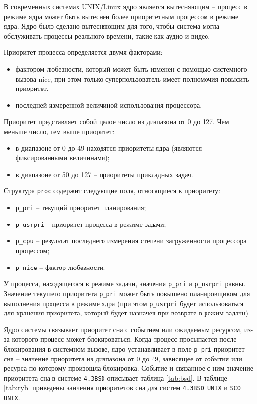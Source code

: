 В современных системах UNIX/Linux ядро является вытесняющим -- процесс
в режиме ядра может быть вытеснен более приоритетным процессом в режиме ядра.
Ядро было сделано вытесняющим для того, чтобы система могла обслуживать
процессы реального времени, такие как аудио и видео.

Приоритет процесса определяется двумя факторами:
\begin{itemize}
    \item фактором любезности, который может быть изменен с помощью системного
          вызова nice, при этом только суперпользователь имеет полномочия повысить приоритет.
    \item последней измеренной величиной использования процессора.
\end{itemize}

Приоритет представляет собой целое число из диапазона от 0 до 127. Чем меньше
число, тем выше приоритет:
\begin{itemize}
    \item в диапазоне от 0 до 49 находятся приоритеты ядра (являются фиксированными величинами);
    \item в диапазоне от 50 до 127 – приоритеты прикладных задач.
\end{itemize}

Структура \texttt{proc} содержит следующие поля, относящиеся к приоритету:
\begin{itemize}
    \item \texttt{p\_pri} – текущий приоритет планирования;
    \item \texttt{p\_usrpri} – приоритет процесса в режиме задачи;
    \item \texttt{p\_cpu} – результат последнего измерения степени
          загруженности процессора процессом;
    \item \texttt{p\_nice} – фактор любезности.
\end{itemize}

У процесса, находящегося в режиме задачи, значения \texttt{p\_pri} и
\texttt{p\_usrpri} равны. Значение текущего приоритета \texttt{p\_pri} может
быть повышено планировщиком для выполнения процесса в режиме ядра (при этом
\texttt{p\_usrpri} будет использоваться для хранения приоритета, который будет
назначен при возврате в режим задачи)

Ядро системы связывает приоритет сна с событием или ожидаемым ресурсом, из-за
которого процесс может блокироваться. Когда процесс просыпается после
блокирования в системном вызове, ядро устанавливает в поле \texttt{p\_pri}
приоритет сна – значение приоритета из диапазона от 0 до 49, зависящее от
события или ресурса по которому произошла блокировка. Событие и связанное с ним
значение приоритета сна в системе \texttt{4.3BSD} описывает таблица 
\ref{tab:bsd}. В таблице \ref{tab:ryb} приведены занчения приоритетов сна для систем \texttt{4.3BSD UNIX} и \texttt{SCO UNIX}.

